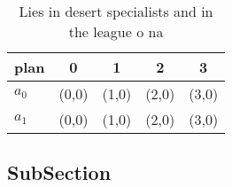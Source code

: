 \documentclass[a4paper]{article}
\begin{document}
\begin{table}
\begin{adjustbox}{width=0.7\columnwidth}
\begin{tabular}{|l|l|l|l|l|}
\hline
\textbf{plan} & \multicolumn{1}{c|}{\textbf{0}} & \multicolumn{1}{c|}{\textbf{1}} & \multicolumn{1}{c|}{\textbf{2}} & \multicolumn{1}{c|}{\textbf{3}} \\ \hline
\textbf{$a_0$}  & (0,0) & (1,0) & (2,0) & (3,0) \\ \hline
\textbf{$a_1$}  & (0,0) & (1,0) & (2,0) & (3,0) \\ \hline
\end{tabular}
\end{adjustbox}
\caption{Lies in desert specialists and in the league o na
}
\end{table}

\subsection{SubSection}
\end{document}
